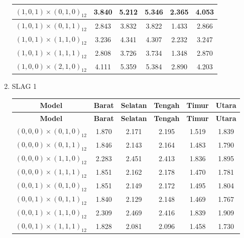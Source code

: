 \begin{enumerate}[label=\alph*.]
\begin{longtable}{|c|c|c|c|c|c|}
        {$(1,0,1) \times (0,1,0)_{12}$} & 3.840 & 5.212 & 5.346 & 2.365 & 4.053 \\ \hline
        {$(1,0,1) \times (0,1,1)_{12}$} & 2.843 & 3.832 & 3.822 & 1.433 & 2.866 \\ \hline
        {$(1,0,1) \times (1,1,0)_{12}$} & 3.236 & 4.341 & 4.307 & 2.232 & 3.247 \\ \hline
        {$(1,0,1) \times (1,1,1)_{12}$} & 2.808 & 3.726 & 3.734 & 1.348 & 2.870 \\ \hline

        {$(1,0,0) \times (2,1,0)_{12}$} & 4.111 & 5.359 & 5.384 & 2.890 & 4.203 \\ \hline

    \end{longtable}

    \item SLAG 1
    \begin{longtable}{|c|c|c|c|c|c|}
        \hline
        \textbf{Model} & \textbf{Barat} & \textbf{Selatan} & \textbf{Tengah} & \textbf{Timur} & \textbf{Utara} \\
        \hline
        \endfirsthead

        \hline
        \textbf{Model} & \textbf{Barat} & \textbf{Selatan} & \textbf{Tengah} & \textbf{Timur} & \textbf{Utara} \\
        \hline
        \endhead

        \hline
        \endfoot
        \hline
        \endlastfoot

        {$(0,0,0) \times (0,1,0)_{12}$} & 1.870 & 2.171 & 2.195 & 1.519 & 1.839 \\ \hline
        {$(0,0,0) \times (0,1,1)_{12}$} & 1.846 & 2.143 & 2.164 & 1.483 & 1.790 \\ \hline
        {$(0,0,0) \times (1,1,0)_{12}$} & 2.283 & 2.451 & 2.413 & 1.836 & 1.895 \\ \hline
        {$(0,0,0) \times (1,1,1)_{12}$} & 1.851 & 2.162 & 2.178 & 1.470 & 1.781 \\ \hline

        {$(0,0,1) \times (0,1,0)_{12}$} & 1.851 & 2.149 & 2.172 & 1.495 & 1.804 \\ \hline
        {$(0,0,1) \times (0,1,1)_{12}$} & 1.840 & 2.129 & 2.148 & 1.469 & 1.767 \\ \hline
        {$(0,0,1) \times (1,1,0)_{12}$} & 2.309 & 2.469 & 2.416 & 1.839 & 1.909 \\ \hline
        {$(0,0,1) \times (1,1,1)_{12}$} & 1.828 & 2.081 & 2.096 & 1.458 & 1.730 \\ \hline


\end{longtable}
\end{enumerate}
